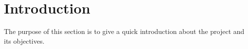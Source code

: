\section{Introduction}

The purpose of this section is to give a quick introduction about the project and its objectives.
